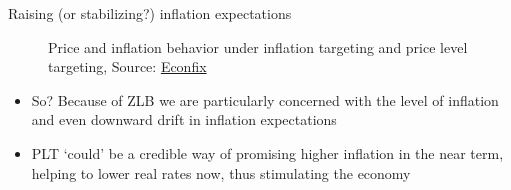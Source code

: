 \begin{frame}{Raising (or stabilizing?) inflation expectations}

\begin{figure}
\begin{center}


\end{center}
\caption{Price and inflation behavior under inflation targeting and price level targeting, Source: \href{https://econfix.wordpress.com/2011/07/02/price-level-targeting-and-inflation-targeting-part-1-the-theory/}{Econfix}}
\end{figure}

\begin{itemize}
\item	So? Because of ZLB we are particularly concerned with the level of inflation and even downward drift in inflation expectations
\item	PLT `could' be a credible way of promising higher inflation in the near term, helping to lower real rates now, thus stimulating the economy
\end{itemize}

\end{frame}


	
